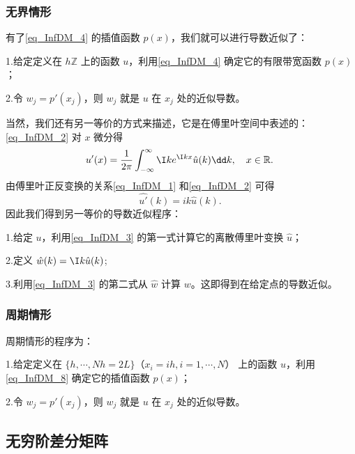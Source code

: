 \subsubsection{无界情形}
有了\autoref{eq_InfDM_4} 的插值函数 $p(x)$，我们就可以进行导数近似了：

1.给定定义在 $h\mathbb Z$ 上的函数 $u$，利用\autoref{eq_InfDM_4} 确定它的有限带宽函数 $p(x)$；

2.令 $w_j=p'(x_j)$，则 $w_j$ 就是 $u$ 在 $x_j$ 处的近似导数。

当然，我们还有另一等价的方式来描述，它是在傅里叶空间中表述的：\autoref{eq_InfDM_2}  对 $x$ 微分得
\begin{equation}
u'(x)=\frac{1}{2\pi}\int_{-\infty}^{\infty} \I ke^{\I kx}\hat u(k)\dd k,\quad x\in \mathbb R.~
\end{equation}
由傅里叶正反变换的关系\autoref{eq_InfDM_1} 和\autoref{eq_InfDM_2} 可得
\begin{equation}
\hat{u'}(k)=ik\hat u(k).~
\end{equation}
因此我们得到另一等价的导数近似程序：

1.给定 $u$，利用\autoref{eq_InfDM_3} 的第一式计算它的离散傅里叶变换 $\hat u$；

2.定义 $\hat w(k)=\I k\hat u(k)$;

3.利用\autoref{eq_InfDM_3} 的第二式从 $\hat w$ 计算 $w$。这即得到在给定点的导数近似。
\subsubsection{周期情形}
周期情形的程序为：

1.给定定义在 $\{h,\cdots,Nh=2L\}$（$x_i=ih,i=1,\cdots,N$） 上的函数 $u$，利用\autoref{eq_InfDM_8} 确定它的插值函数 $p(x)$；

2.令 $w_j=p'(x_j)$，则 $w_j$ 就是 $u$ 在 $x_j$ 处的近似导数。


\subsection{无穷阶差分矩阵}
